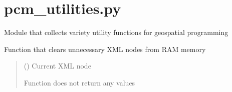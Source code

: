\documentclass[letterpaper,10pt,english]{sphinxmanual}
\begin{document}
\sphinxstepscope


\chapter{pcm\_utilities.py}
\label{\detokenize{pcm_utilities:module-pcm_utilities}}\label{\detokenize{pcm_utilities:pcm-utilities-py}}\label{\detokenize{pcm_utilities::doc}}
\sphinxAtStartPar
Module that collects variety utility functions for geospatial programming

\begin{fulllineitems}
\label{\detokenize{pcm_utilities:pcm_utilities.clear_xml_node}}
\pysigstartsignatures
{}
\pysigstopsignatures
\sphinxAtStartPar
Function that clears unnecessary XML nodes from RAM memory
\begin{quote}\begin{description}
\sphinxAtStartPar
{} () \textendash{} Current XML node

\sphinxAtStartPar
{}

\sphinxAtStartPar
Function does not return any values

\end{description}\end{quote}

\end{fulllineitems}

\end{document}
